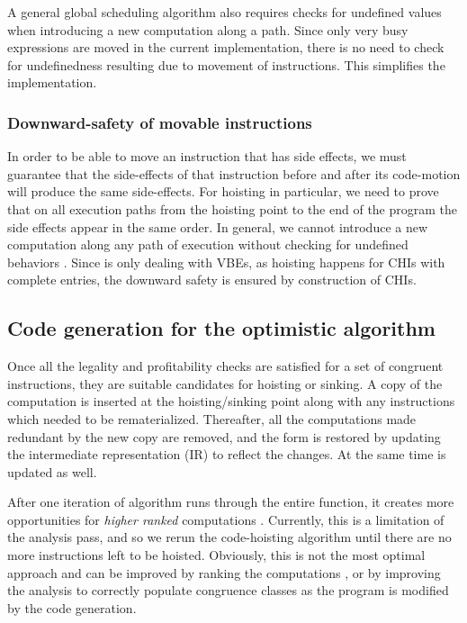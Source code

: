 \documentclass[sigplan,10pt,review,anonymous]{acmart}\settopmatter{printfolios=true,printccs=false,printacmref=false}
\begin{document}
A general global scheduling algorithm also requires checks for undefined values
when introducing a new computation along a path. Since only very busy
expressions are moved in the current implementation, there is no need to check
for undefinedness resulting due to movement of instructions. This simplifies the
implementation.


\subsubsection{Downward-safety of movable instructions}

In order to be able to move an instruction that has side effects, we must
guarantee that the side-effects of that instruction before and after its
code-motion will produce the same side-effects.  For hoisting in particular, we
need to prove that on all execution paths from the hoisting point to the end of
the program the side effects appear in the same order. In general, we cannot
introduce a new computation along any path of execution without checking for
undefined behaviors \cite{undef}. Since \GCM{} is only dealing with VBEs, as
hoisting happens for CHIs with complete entries, the downward safety is ensured
by construction of CHIs.


\subsection{Code generation for the optimistic \gcm{} algorithm}
\label{subsec:optimistic}
Once all the legality and profitability checks are satisfied for a set of
congruent instructions, they are suitable candidates for hoisting or sinking. A
copy of the computation is inserted at the hoisting/sinking point along with any
instructions which needed to be rematerialized. Thereafter, all the computations
made redundant by the new copy are removed, and the \SSA{} form is restored by
updating the intermediate representation (IR) to reflect the changes. At the
same time \MemorySSA{} is updated as well.

After one iteration of algorithm runs through the entire function, it creates
more opportunities for \emph{higher ranked} computations
\cite{rosen1988global}. Currently, this is a limitation of the \GVN{} analysis
pass, and so we rerun the code-hoisting algorithm until there are no more
instructions left to be hoisted.  Obviously, this is not the most optimal
approach and can be improved by ranking the computations \cite{rosen1988global},
or by improving the \GVN{} analysis to correctly populate congruence classes as
the program is modified by the code generation.
\end{document}
